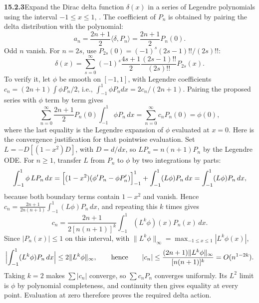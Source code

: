 \par\bigskip
\noindent\textbf{15.2.3}\quad Expand the Dirac delta function
$\delta(x)$ in a series of Legendre polynomials using the interval
$-1\le x\le1$, .
\solution
The coefficient of $P_n$ is obtained by pairing the delta distribution
with the polynomial:
\[
a_n=\frac{2n+1}{2}\langle\delta,P_n\rangle
=\frac{2n+1}{2}P_n(0).
\]
Odd $n$ vanish. For $n=2s$, use
$P_{2s}(0)=(-1)^s(2s-1)!!/(2s)!!$:
\[
\boxed{\delta(x)=\sum_{s=0}^\infty
(-1)^s\frac{4s+1}{2}\frac{(2s-1)!!}{(2s)!!}P_{2s}(x)}.
\]
To verify it, let $\phi$ be smooth on $[-1,1]$, with Legendre
coefficients $c_n=(2n+1)\int\phi P_n/2$, i.e.,
$\int_{-1}^1\phi P_ndx=2c_n/(2n+1)$. Pairing the proposed series
with $\phi$ term by term gives
\[
\sum_{n=0}^\infty\frac{2n+1}2P_n(0)\int_{-1}^1\phi P_n\,dx
=\sum_{n=0}^\infty c_nP_n(0)=\phi(0),
\]
where the last equality is the Legendre expansion of $\phi$ evaluated
at $x=0$.
Here is the convergence justification for that pointwise evaluation.
Set $L=-D[(1-x^2)D]$, with $D=d/dx$, so $LP_n=n(n+1)P_n$ by the
Legendre ODE. For
$n\ge1$, transfer $L$ from $P_n$ to $\phi$ by two integrations by parts:
\[
\int_{-1}^1\phi\,LP_n\,dx
=\Bigl[(1-x^2)(\phi'P_n-\phi P_n')\Bigr]_{-1}^1
+\int_{-1}^1(L\phi)P_n\,dx
=\int_{-1}^1(L\phi)P_n\,dx,
\]
because both boundary terms contain $1-x^2$ and vanish. Hence
$c_n=\frac{2n+1}{2n(n+1)}\int_{-1}^1(L\phi)P_n\,dx$, and repeating
this $k$ times gives
\[
c_n=\frac{2n+1}{2[n(n+1)]^k}\int_{-1}^1(L^k\phi)(x)P_n(x)\,dx.
\]
Since $|P_n(x)|\le1$ on this interval, with
$\|L^k\phi\|_\infty=\max_{-1\le x\le1}|L^k\phi(x)|$,
\[
\Bigl|\int_{-1}^1(L^k\phi)P_n\,dx\Bigr|\le2\|L^k\phi\|_\infty,
\qquad\text{hence}\qquad
|c_n|\le\frac{(2n+1)\|L^k\phi\|_\infty}{[n(n+1)]^k}=O(n^{1-2k}).
\]
Taking $k=2$ makes $\sum|c_n|$ converge, so
$\sum c_nP_n$ converges uniformly. Its $L^2$ limit is $\phi$ by
polynomial completeness, and continuity then gives equality at every
point. Evaluation at zero therefore proves the required delta action.

